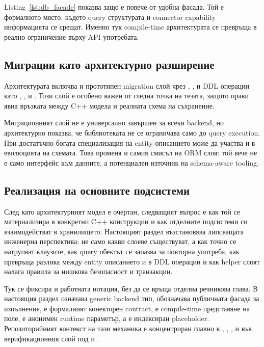 Listing~\ref{lst:db_facade} показва защо  е повече от удобна фасада. Той е формалното място, където query структурата и connector capability информацията се срещат. Именно тук compile-time архитектурата се превръща в реално ограничение върху API употребата.

\subsection{Миграции като архитектурно разширение}

Архитектурата включва и прототипен migration слой чрез , ,  и DDL операции като , ,  и . Този слой е особено важен от гледна точка на тезата, защото прави явна връзката между C++ модела и реалната схема на съхранение.

Миграционният слой не е универсално завършен за всеки backend, но архитектурно показва, че библиотеката не се ограничава само до query execution. При достатъчно богата специализация на  entity описанието може да участва и в еволюцията на схемата. Това променя и самия смисъл на ORM слоя: той вече не е само интерфейс към данните, а потенциален източник на schema-aware tooling.

\subsection{Реализация на основните подсистеми}

След като архитектурният модел е очертан, следващият въпрос е как той се материализира в конкретни C++ конструкции и как отделните подсистеми си взаимодействат в хранилището. Настоящият раздел възстановява липсващата инженерна перспектива: не само какви слоеве съществуват, а как точно се натрупват  клаузите, как query обектът се запазва за повторна употреба, как  превръща разлика между entity описанието и  в DDL операции и как helper слоят налага правила за нишкова безопасност и транзакции.

Тук се фиксира и работната нотация, без да се връща отделна речникова глава. В настоящия раздел  означава generic backend тип,  обозначава публичната фасада за изпълнение,  е формалният конекторен contract,  е compile-time представяне на поле,  е анонимен runtime параметър, а  е индексиран placeholder. Репозиторийният контекст на тази механика е концентриран главно в , , ,  и във верификационния слой под  и .


